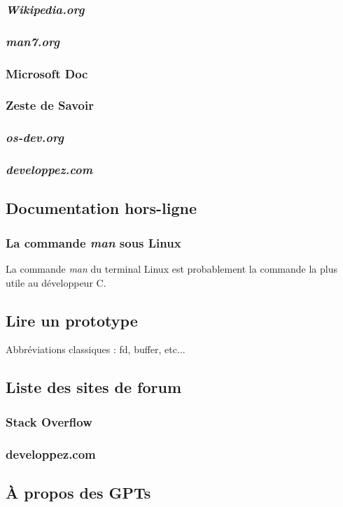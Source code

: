 \documentclass{minitelreport}
\begin{document}
\begin{refsection}
				\subsubsection{\textit{Wikipedia.org}}	
				\subsubsection{\textit{man7.org}}
				\subsubsection{Microsoft Doc}
				\subsubsection{Zeste de Savoir}
				\subsubsection{\textit{os-dev.org}}
				\subsubsection{\textit{developpez.com}}
			\subsection{Documentation hors-ligne}
				\subsubsection{La commande \textit{man} sous Linux}
				La commande \textit{man} du terminal Linux est probablement la commande la plus utile au développeur C.
			\subsection{Lire un prototype}
			Abbréviations classiques : fd, buffer, etc...
			\subsection{Liste des sites de forum}
				\subsubsection{Stack Overflow}
				\subsubsection{developpez.com}
			\subsection{À propos des GPTs}
			

\end{refsection}
\end{document}
